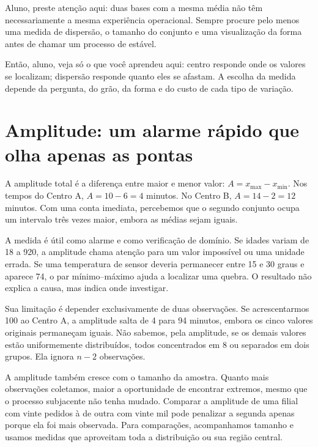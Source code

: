 \begin{GuidedBox}
Aluno, preste atenção aqui: duas bases com a mesma média não têm necessariamente a mesma experiência operacional. Sempre procure pelo menos uma medida de dispersão, o tamanho do conjunto e uma visualização da forma antes de chamar um processo de estável.
\end{GuidedBox}

\begin{SummaryBox}
Então, aluno, veja só o que você aprendeu aqui: centro responde onde os valores se localizam; dispersão responde quanto eles se afastam. A escolha da medida depende da pergunta, do grão, da forma e do custo de cada tipo de variação.
\end{SummaryBox}

\section{Amplitude: um alarme rápido que olha apenas as pontas}

A amplitude total é a diferença entre maior e menor valor: $A=x_{\max}-x_{\min}$. Nos tempos do Centro A, $A=10-6=4$ minutos. No Centro B, $A=14-2=12$ minutos. Com uma conta imediata, percebemos que o segundo conjunto ocupa um intervalo três vezes maior, embora as médias sejam iguais.

A medida é útil como alarme e como verificação de domínio. Se idades variam de 18 a 920, a amplitude chama atenção para um valor impossível ou uma unidade errada. Se uma temperatura de sensor deveria permanecer entre 15 e 30 graus e aparece 74, o par mínimo--máximo ajuda a localizar uma quebra. O resultado não explica a causa, mas indica onde investigar.

Sua limitação é depender exclusivamente de duas observações. Se acrescentarmos 100 ao Centro A, a amplitude salta de 4 para 94 minutos, embora os cinco valores originais permaneçam iguais. Não sabemos, pela amplitude, se os demais valores estão uniformemente distribuídos, todos concentrados em 8 ou separados em dois grupos. Ela ignora $n-2$ observações.

A amplitude também cresce com o tamanho da amostra. Quanto mais observações coletamos, maior a oportunidade de encontrar extremos, mesmo que o processo subjacente não tenha mudado. Comparar a amplitude de uma filial com vinte pedidos à de outra com vinte mil pode penalizar a segunda apenas porque ela foi mais observada. Para comparações, acompanhamos tamanho e usamos medidas que aproveitam toda a distribuição ou sua região central.


